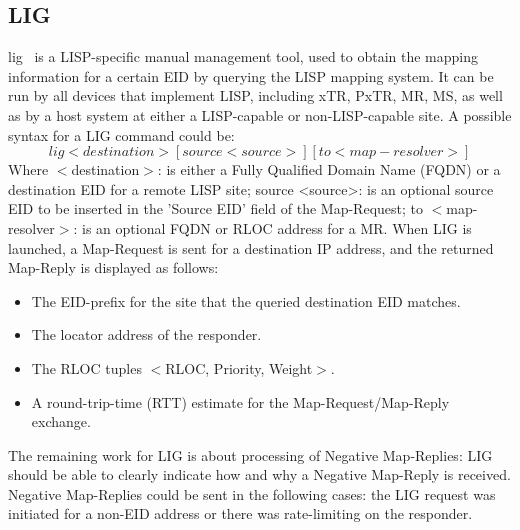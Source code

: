 \subsection{LIG}
\label{subsec:implementation_lig}
\acrfull{lig}~\cite{rfc6835} is a LISP-specific manual management tool, used to obtain the mapping information for a certain EID by querying the LISP mapping system. It can be run by all devices that implement LISP, including xTR, PxTR, MR, MS, as well as by a host system at either a LISP-capable or non-LISP-capable site. A possible syntax for a LIG command could be:
\begin{equation}
lig <destination> [source <source>] [to <map-resolver>] \nonumber
\end{equation}
Where $<$destination$>$: is either a Fully Qualified Domain Name (FQDN) or a destination EID for a remote LISP site; source <source>: is an optional source EID to be inserted in the 'Source EID' field of the Map-Request; to $<$map-resolver$>$: is an optional FQDN or RLOC address for a MR. When LIG is launched, a Map-Request is sent for a destination IP address, and the returned Map-Reply is displayed as follows:
\begin{itemize}[noitemsep,topsep=0pt]
    \item The EID-prefix for the site that the queried destination EID matches.
    \item The locator address of the responder.
    \item The RLOC tuples $<$RLOC, Priority, Weight$>$.
    \item A round-trip-time (RTT) estimate for the Map-Request/Map-Reply exchange.
\end{itemize}

The remaining work for LIG is about processing of Negative Map-Replies: LIG should be able to clearly indicate how and why a Negative Map-Reply is received. Negative Map-Replies could be sent in the following cases: the LIG request was initiated for a non-EID address or there was rate-limiting on the responder.

